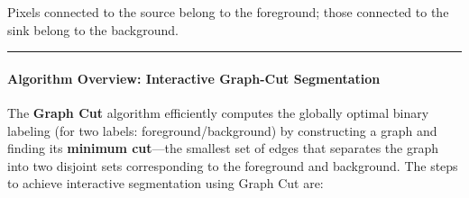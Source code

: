\documentclass[11pt]{article}
\begin{document}
Pixels connected to the source belong to the foreground; those connected
to the sink belong to the background.

\begin{center}\rule{0.5\linewidth}{0.5pt}\end{center}

\hypertarget{algorithm-overview-interactive-graph-cut-segmentation}{%
\paragraph{\texorpdfstring{\textbf{Algorithm Overview: Interactive
Graph-Cut
Segmentation}}{Algorithm Overview: Interactive Graph-Cut Segmentation}}\label{algorithm-overview-interactive-graph-cut-segmentation}}

The \textbf{Graph Cut} algorithm efficiently computes the globally
optimal binary labeling (for two labels: foreground/background) by
constructing a graph and finding its \textbf{minimum cut}---the smallest
set of edges that separates the graph into two disjoint sets
corresponding to the foreground and background. The steps to achieve
interactive segmentation using Graph Cut are:
\end{document}
